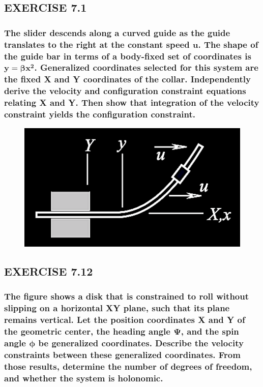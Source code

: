 \documentclass[12pt, letterpaper]{../assignment}
\begin{document}
\subsection*{EXERCISE 7.1}
\subsubsection*{The slider descends along a curved guide as
the guide translates to the right at the constant speed $\bm{u}$.
The shape of the guide bar in terms of a body-fixed set of coordinates is $\bm{y = \beta x^2}$.
Generalized coordinates selected for this system are the fixed X and Y coordinates of the collar.
Independently derive the velocity and configuration constraint equations relating X and Y.
Then show that integration of the velocity constraint yields the configuration constraint.}

\begin{figure}[H]
    \centering
    \includegraphics[scale=0.9,frame]{images/Q7_1.png}
\end{figure}



\subsection*{EXERCISE 7.12}
\subsubsection*{The figure shows a disk that is constrained to roll
without slipping on a horizontal XY plane,
such that its plane remains vertical.
Let the position coordinates X and Y of the geometric center,
the heading angle $\bm{\Psi}$,
and the spin angle $\bm{\phi}$ be generalized coordinates.
Describe the velocity constraints between these generalized coordinates.
From those results, determine the number of degrees of freedom,
and whether the system is holonomic.}
\end{document}
